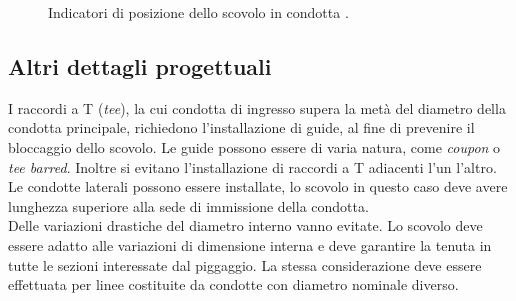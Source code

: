 \begin{figure}[htbp]
    {  \label{fig:indicatori-magnetici}}
    \caption{Indicatori di posizione dello scovolo in condotta \parencite{williamson2015guide}.}
    \label{fig:indicatori-piggaggio}
\end{figure}

\subsection{Altri dettagli progettuali}
I raccordi a T (\textit{tee}), la cui condotta di ingresso supera la metà del diametro della condotta principale, richiedono l'installazione di guide, al fine di prevenire il bloccaggio dello scovolo. Le guide possono essere di varia natura, come \textit{coupon} o \textit{tee barred}. Inoltre si evitano l'installazione di raccordi a T adiacenti l'un l'altro.\\
Le condotte laterali possono essere installate, lo scovolo in questo caso deve avere lunghezza superiore alla sede di immissione della condotta.\\
Delle variazioni drastiche del diametro interno vanno evitate. Lo scovolo deve essere adatto alle variazioni di dimensione interna e deve garantire la tenuta in tutte le sezioni interessate dal piggaggio. La stessa considerazione deve essere effettuata per linee costituite da condotte con diametro nominale diverso. 

